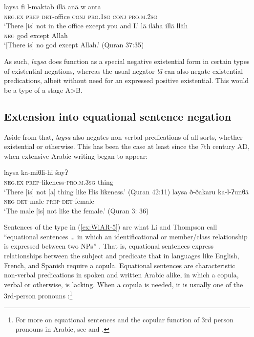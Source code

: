 \documentclass[output=paper,colorlinks,citecolor=brown]{langscibook}
\begin{document}
\ea \label{ex:WiAR-4}
  \ea
  	\gll laysa fī l-maktab illā anā w anta\\
  	\textsc{neg.ex} \textsc{prep} \textsc{det}-office \textsc{conj} \textsc{pro.1sg} \textsc{conj} \textsc{pro.m.2sg}\\
  	\glt ‘There [is] not in the office except you and I.’ \citep[273]{adwan2000a}
  \ex
  	\gll lā ilāha illā llāh\\
  	\textsc{neg} god except Allah\\
  	\glt ‘[There is] no god except Allah.’ (Quran 37:35)
\z \z

As such, \textit{laysa} does function as a special negative existential form in certain types of existential negations, whereas the usual negator \textit{lā} can also negate existential predications, albeit without need for an expressed positive existential. This would be a type of a stage A>B.

\subsection{Extension into equational sentence negation} \label{s:WiAR-2.2}

Aside from that, \textit{laysa} also negates non-verbal predications of all sorts, whether existential or otherwise. This has been the case at least since the 7th century AD, when extensive Arabic writing began to appear:

\ea \label{ex:WiAR-5}
  \ea
  	\gll laysa ka-miθli-hi šayʔ\\
  	\textsc{neg.ex} \textsc{prep}-likeness-\textsc{pro.m.3sg} thing\\
  	\glt ‘There [is] not [a] thing like His likeness.’ (Quran 42:11)
  \ex
  	\gll laysa ð-ðakaru ka-l-ʔunθā\\
  	\textsc{neg} \textsc{det}-male \textsc{prep-det}-female\\
  	\glt ‘The male [is] not like the female.’ (Quran 3: 36)
\z \z



Sentences of the type in (\ref{ex:WiAR-5}) are what Li and Thompson call “equational sentences … in which an identificational or member/class relationship is expressed between two NPs” \citeyearpar[419]{li1977a}. That is, equational sentences express relationships between the subject and predicate that in languages like English, French, and Spanish require a copula. Equational sentences are characteristic non-verbal predications in spoken and written Arabic alike, in which a copula, verbal or otherwise, is lacking. When a copula is needed, it is usually one of the 3rd-person pronouns \citep[431--433]{li1977a}:\footnote{For more on equational sentences and the copular function of 3rd person pronouns in Arabic, see \citet{eid1983a, eid1991a} and \citet{choueiri2016a}.}
\end{document}
